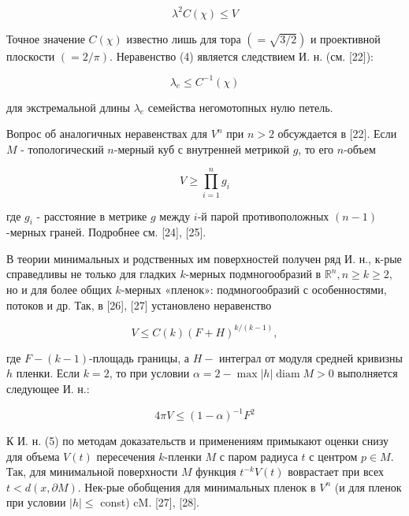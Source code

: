 \documentclass[10pt]{article}
\begin{document}
\[

\lambda^{2} C(\chi) \leqslant V

\]



Точное значение $C(\chi)$ известно лишь для тора $(=\sqrt{3 / 2})$ и проективной плоскости $(=2 / \pi)$. Неравенство (4) является следствием И. н. (см. [22]):



\[

\lambda_{e} \leqslant C^{-1}(\chi)

\]



для экстремальной длины $\lambda_{e}$ семейства негомотопных нулю петель.



Вопрос об аналогичных неравенствах для $V^{n}$ при $n>2$ обсуждается в [22]. Если $M$ - топологический $n$-мерный куб с внутренней метрикой $g$, то его $n$-объем



\[

V \geqslant \prod_{i=1}^{n} g_{i}

\]



где $g_{i}$ - расстояние в метрике $g$ между $i$-й парой противоположных $(n-1)$-мерных граней. Подробнее см. [24], [25].



В теории минимальных и родственных им поверхностей получен ряд И. н., к-рые справедливы не только для гладких $k$-мерных подмногообразий в $\mathbb{R}^{n}, n \geqslant k \geqslant 2$, но и для более общих $k$-мерных «пленок»: подмногообразий с особенностями, потоков и др. Так, в [26], [27] установлено неравенство



\[

V \leqslant C(k)(F+H)^{k /(k-1)},

\]



где $F-(k-1)$-площадь границы, а $H-$ интеграл от модуля средней кривизны $h$ пленки. Если $k=2$, то при условии $\alpha=2-\max |h| \operatorname{diam} M>0$ выполняется следующее И. н.:



\[

4 \pi V \leqslant(1-\alpha)^{-1} F^{2}

\]



К И. н. (5) по методам доказательств и применениям примыкают оценки снизу для объема $V(t)$ пересечения $k$-пленки $M$ с паром радиуса $t$ с центром $p \in M$. Так, для минимальной поверхности $M$ функция $t^{-k} V(t)$ воврастает при всех $t<d(x, \partial M)$. Нек-рые обобщения для минимальных пленок в $V^{n}$ (и для пленок при условии $|h| \leqslant$ const) cM. [27], [28].
\end{document}
